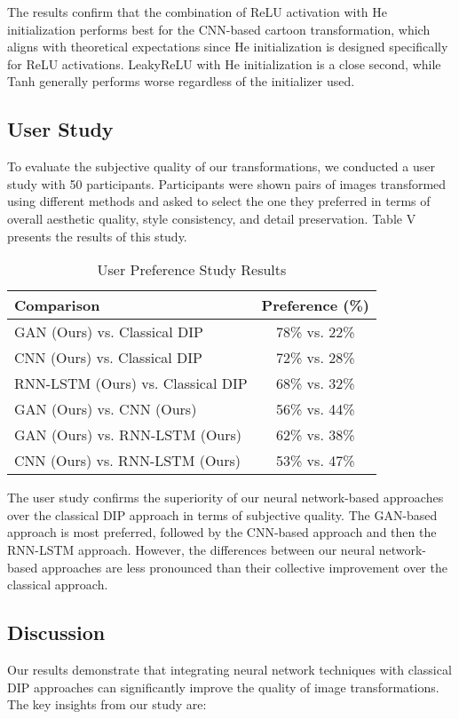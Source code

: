 \documentclass[conference]{IEEEtran}
\begin{document}
The results confirm that the combination of ReLU activation with He initialization performs best for the CNN-based cartoon transformation, which aligns with theoretical expectations since He initialization is designed specifically for ReLU activations. LeakyReLU with He initialization is a close second, while Tanh generally performs worse regardless of the initializer used.

\subsection{User Study}
To evaluate the subjective quality of our transformations, we conducted a user study with 50 participants. Participants were shown pairs of images transformed using different methods and asked to select the one they preferred in terms of overall aesthetic quality, style consistency, and detail preservation. Table V presents the results of this study.

\begin{table}[!t]
\caption{User Preference Study Results}
\label{table_user_study}
\centering
\begin{tabular}{lc}
\toprule
\textbf{Comparison} & \textbf{Preference (\%)} \\
\midrule
GAN (Ours) vs. Classical DIP & 78\% vs. 22\% \\
CNN (Ours) vs. Classical DIP & 72\% vs. 28\% \\
RNN-LSTM (Ours) vs. Classical DIP & 68\% vs. 32\% \\
GAN (Ours) vs. CNN (Ours) & 56\% vs. 44\% \\
GAN (Ours) vs. RNN-LSTM (Ours) & 62\% vs. 38\% \\
CNN (Ours) vs. RNN-LSTM (Ours) & 53\% vs. 47\% \\
\bottomrule
\end{tabular}
\end{table}

The user study confirms the superiority of our neural network-based approaches over the classical DIP approach in terms of subjective quality. The GAN-based approach is most preferred, followed by the CNN-based approach and then the RNN-LSTM approach. However, the differences between our neural network-based approaches are less pronounced than their collective improvement over the classical approach.

\subsection{Discussion}
Our results demonstrate that integrating neural network techniques with classical DIP approaches can significantly improve the quality of image transformations. The key insights from our study are:
\end{document}
